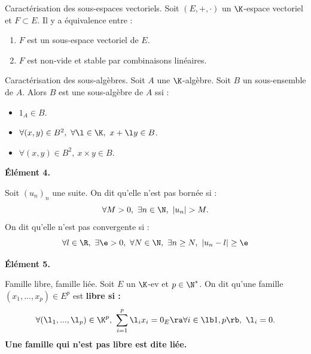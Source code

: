 \documentclass[11pt]{article}
\begin{document}
\begin{prop}{Caractérisation des sous-espaces vectoriels.}{}
    Soit $(E,+,\cdot)$ un $\K$-espace vectoriel et $F\subset E$. Il y a équivalence entre :
    \begin{enumerate}
        \item $F$ est un sous-espace vectoriel de $E$.
        \item $F$ est non-vide et stable par combinaisons linéaires.
    \end{enumerate}
\end{prop}

\begin{prop}{Caractérisation des sous-algèbres.}{}
    Soit $A$ une $\K$-algèbre. Soit $B$ un sous-ensemble de $A$. Alors $B$ est une sous-algèbre de $A$ ssi :
    \begin{itemize}
        \item $1_A\in B$.
        \item $\forall (x,y)\in B^2, ~ \forall \l \in \K, ~ x+\l y \in B$.
        \item $\forall (x,y)\in B^2, ~ x\times y \in B$.
    \end{itemize}
\end{prop}

\begin{center}
    \bf{Élément 4.}
\end{center}

\begin{defi}{}{}
    Soit $(u_n)_n$ une suite. On dit qu'elle n'est pas bornée si :
    \begin{equation*}
        \forall M > 0, ~ \exists n \in \N, ~ |u_n| > M.
    \end{equation*}
    On dit qu'elle n'est pas convergente si :
    \begin{equation*}
        \forall l \in \R, ~ \exists \e > 0, ~ \forall N \in \N, ~ \exists n \geq N, ~ |u_n-l|\geq\e
    \end{equation*}
\end{defi}

\begin{center}
    \bf{Élément 5.}
\end{center}

\begin{defi}{Famille libre, famille liée.}{}
    Soit $E$ un $\K$-ev et $p\in\N^*$. On dit qu'une famille $(x_1,...,x_p)\in E^p$ est \bf{libre} si :
    \begin{equation*}
        \forall (\l_1,...,\l_p) \in \K^p, ~ \sum_{i=1}^p\l_ix_i=0_E \ra \forall i \in \lb1,p\rb, ~ \l_i = 0.
    \end{equation*}
    Une famille qui n'est pas libre est dite \bf{liée}.
\end{defi}
\end{document}
